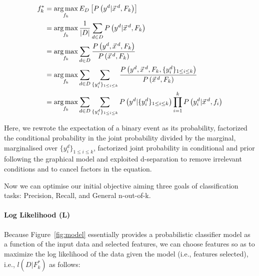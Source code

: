 {\small
\begin{align}
f_k^*&=\argmax_{f_k}E_D\left[P\left(y^d|\vec{x}^{\,d},F_k\right)\right]\nonumber\\
&=\argmax_{f_k}\frac{1}{|D|}\sum_{d\in D} P\left(y^d | \vec{x}^{\,d},F_k\right)\nonumber\\
&=\argmax_{f_k}\sum_{d\in D}\frac{P\left(y^d,\vec{x}^{\,d},F_k\right)}{P\left(\vec{x}^{\,d},F_k\right)}\nonumber\\
&=\argmax_{f_k}\sum_{d\in D}\sum_{\{y_{i}^d\}_{1\leq i\leq k}}\frac{P\left(y^d,\vec{x}^{\,d},F_k,\{y_{i}^d\}_{1\leq i\leq k}\right)}{P\left(\vec{x}^{\,d},F_k\right)}\nonumber\\
&=\argmax_{f_k}\sum_{d\in D}\sum_{\{y_i^d\}_{1\leq i\leq k}}P\left(y^d|\{y^d_i\}_{1\leq i\leq k}\right)\prod_{i=1}^kP\left(y_i^d|\vec{x}^{\,d},f_i\right)\label{eq:expect}
\end{align}}

Here, we rewrote the expectation of a binary event as its probability,
factorized the conditional probability in the joint probability
divided by the marginal, marginalised over $\{y^d_i\}_{1\leq i\leq
  k}$, factorized joint probability in conditional and prior following
the graphical model and exploited d-separation to remove irrelevant
conditions and to cancel factors in the equation.

Now we can optimise our initial objective aiming three goals of classification tasks: Precision, Recall, and General n-out-of-k.
\ENDCOMMENT

\paragraph{Log Likelihood (L)}

Because Figure~\ref{fig:model} essentially provides a probabilistic classifier model as a function
of the input data and selected features, we can choose features so as to maximize the log likelihood
of the data given the model (i.e., features selected), i.e., $l(D|F_k^*)$ as follows:

